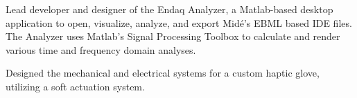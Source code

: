 \documentclass[letterpaper]{deedy-resume} %
\begin{document}
\sectionspace %



Lead developer and designer of the Endaq Analyzer, a Matlab-based desktop application to open, visualize, analyze, and export Midé's EBML based IDE files.  The Analyzer uses Matlab's Signal Processing Toolbox to calculate and render various time and frequency domain analyses.  

\sectionspace %



Designed the mechanical and electrical systems for a custom haptic glove, utilizing a soft actuation system.  

\sectionspace %



%
%
%
\end{document}
